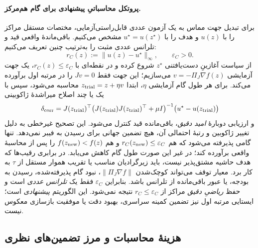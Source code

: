 \paragraph{پروتکل محاسباتیِ پیشنهادی برای گام هم‌مرکز.}
برای تبدیل جهت مماس به یک آزمون عددی قابل‌راستی‌آزمایی،
مختصات مستقل مراکز را با $u(z)$ و هدف را با
$u^\star=u(z^\star)$ مشخص می‌کنیم. باقی‌ماندهٔ واقعی قید
و تلرانس عددی مثبت را به‌ترتیب چنین تعریف می‌کنیم:
\begin{equation}\label{cmp:eq:ch3-fixed-center-residual}
r_C(z):=\|u(z)-u^\star\|_\infty,
\qquad \varepsilon_C>0.
\end{equation}
از سیاست آغازینِ دست‌یافتنی $z^\star$ شروع کرده و
در نقطه‌ای با $r_C(z)\le\varepsilon_C$،
یک جهت آزمایشی $v=-\Pi_J\nabla f(z)$
می‌سازیم؛ این جهت فقط $Jv=0$ را در مرتبه اول
برآورده می‌کند. برای هر طول گام آزمایشی $\eta$،
ابتدا $z_{\rm trial}=z+\eta v$ محاسبه می‌شود،
سپس با یک یا چند اصلاح میراشدهٔ ژاکوبینی
\[
\delta_{\rm corr}
=J(z_{\rm trial})^\top
\bigl(J(z_{\rm trial})J(z_{\rm trial})^\top+
\mu I\bigr)^{-1}
\bigl(u^\star-u(z_{\rm trial})\bigr)
\]
و ارزیابی دوبارهٔ \emph{امید دقیق}،
باقی‌مانده قید کنترل می‌شود.
این تصحیح غیرخطی به دلیل تغییر ژاکوبین
و رتبهٔ احتمالی آن، هیچ تضمین جهانی
برای رسیدن به فیبر نمی‌دهد.
تنها گامی پذیرفته می‌شود که هم
$r_C(z_{\rm new})\le\varepsilon_C$
و هم $f(z_{\rm new})<f(z)$
را پس از محاسبهٔ واقعی برآورده کند؛
در غیر این صورت طول گام کاهش می‌یابد.
در برابری رقیب‌ها که هدف حاشیه
مشتق‌پذیر نیست، باید زیرگرادیان مناسب
یا تقریب هموار مستقل از $\tau$ به کار برد.
معیار توقف می‌تواند کوچک‌شدن
$\|\Pi_J\nabla f\|$، نبود گام پذیرفته‌شده،
رسیدن به بودجه، یا عبور باقی‌مانده از
تلرانس باشد. بنابراین
$\varepsilon_C$ فقط یک \emph{تلرانس عددی}
است و حفظ \emph{ریاضیِ دقیق} مراکز
از $r_C\le\varepsilon_C$ نتیجه نمی‌شود.
این الگوریتم \emph{پیشنهادی} است؛
ایستایی مرتبه اول نیز تضمین کمینه سراسری،
بهبود دقت یا موفقیت بازسازی معکوس نیست.



\subsection{هزینهٔ محاسبات و مرز تضمین‌های نظری}

